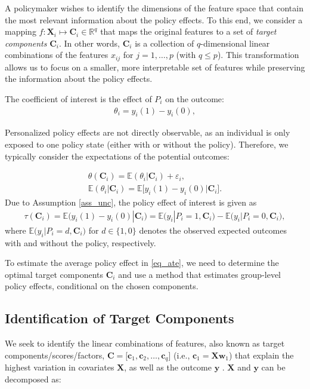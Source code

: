 \documentclass[12pt]{article}
\begin{document}
A policymaker wishes to identify the dimensions of the feature space that contain the most relevant information about the policy effects. To this end, we consider a mapping $f: \mathbf{X}_{i} \mapsto \mathbf{C}_{i} \in \mathbb{R}^q$ that maps the original features to a set of \textit{target components} $\mathbf{C}_i$. In other words, $\mathbf{C}_i$ is a collection of $q$-dimensional linear combinations of the features $x_{ij}$ for $j = 1, \dots, p$ (with $q \leq  p$). This transformation allows us to focus on a smaller, more interpretable set of features while preserving the information about the policy effects.
 
The coefficient of interest is the effect of $P_i$ on the outcome:
\begin{align*}
    \theta_{i}= y_{i}(1) - y_{i}(0),
\end{align*}

Personalized policy effects are not directly observable, as an individual is only exposed to one policy state (either with or without the policy). Therefore, we typically consider the expectations of the potential outcomes:

\begin{align*}
    \theta(\mathbf{C}_i) = \mathbb{E}(\theta_i|\mathbf{C}_i) + \varepsilon_i, \\
    \mathbb{E}(\theta_i|\mathbf{C}_i) = \mathbb{E}\big[y_{i}(1) - y_{i}(0)\big|\mathbf{C}_i].
\end{align*}
Due to Assumption \ref{ass_unc}, the policy effect of interest is given as 
\begin{align}\label{eq_ate}
   \tau(\mathbf{C}_i) = \mathbb{E}\big(y_i(1) -  y_i(0)|\mathbf{C}_i\big) =  \mathbb{E}\big(y_i|P_i = 1,\mathbf{C}_i\big)  -   \mathbb{E}\big(y_i|P_i = 0,\mathbf{C}_i\big),
\end{align}
where $\mathbb{E}\big(y_i|P_i = d,\mathbf{C}_i\big)$ for $d \in \{1, 0\}$ denotes the observed expected outcomes with and without the policy, respectively. 

To estimate the average policy effect in \eqref{eq_ate}, we need to determine the optimal target components $\mathbf{C}_i$ and use a method that estimates group-level policy effects, conditional on the chosen components.


\subsection{Identification of Target Components}
We seek to identify the linear combinations of features, also known as target components/scores/factors, $\mathbf{C} = [\mathbf{c}_1, \mathbf{c}_2, \dots, \mathbf{c}_q$] (i.e., $\mathbf{c}_1 = \mathbf{X}\mathbf{w}_1$) that explain the highest variation in covariates $\mathbf{X}$, as well as the outcome $\mathbf{y}$ \citep{tobias1995introduction, abdi2003partial}. $\mathbf{X}$ and $\mathbf{y}$ can be decomposed as:
\end{document}
